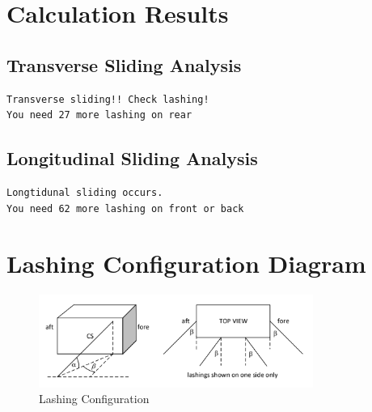 \documentclass[12pt]{article}
\begin{document}
\section{Calculation Results}

\subsection{Transverse Sliding Analysis}
\begin{verbatim}
Transverse sliding!! Check lashing!
You need 27 more lashing on rear

\end{verbatim}

\subsection{Longitudinal Sliding Analysis}
\begin{verbatim}
Longtidunal sliding occurs.
You need 62 more lashing on front or back

\end{verbatim}

\section{Lashing Configuration Diagram}
\begin{figure}[H]
\centering
\includegraphics[width=0.8\textwidth]{pics/lashingPic.png}
\caption{Lashing Configuration}
\end{figure}
\end{document}
